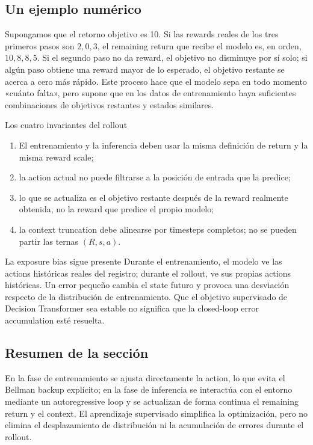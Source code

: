 \subsection{Un ejemplo numérico}

Supongamos que el retorno objetivo es 10. Si las rewards reales de los tres primeros pasos son $2,0,3$, el remaining return que recibe el modelo es, en orden, $10,8,8,5$. Si el segundo paso no da reward, el objetivo no disminuye por sí solo; si algún paso obtiene una reward mayor de lo esperado, el objetivo restante se acerca a cero más rápido. Este proceso hace que el modelo sepa en todo momento «cuánto falta», pero supone que en los datos de entrenamiento haya suficientes combinaciones de objetivos restantes y estados similares.

\begin{importantbox}{Los cuatro invariantes del rollout}
\begin{enumerate}
  \item El entrenamiento y la inferencia deben usar la misma definición de return y la misma reward scale;
  \item la action actual no puede filtrarse a la posición de entrada que la predice;
  \item lo que se actualiza es el objetivo restante después de la reward realmente obtenida, no la reward que predice el propio modelo;
  \item la context truncation debe alinearse por timesteps completos; no se pueden partir las ternas $(R,s,a)$.
\end{enumerate}
\end{importantbox}

\begin{warningbox}{La exposure bias sigue presente}
Durante el entrenamiento, el modelo ve las actions históricas reales del registro; durante el rollout, ve sus propias actions históricas. Un error pequeño cambia el state futuro y provoca una desviación respecto de la distribución de entrenamiento. Que el objetivo supervisado de Decision Transformer sea estable no significa que la closed-loop error accumulation esté resuelta.
\end{warningbox}

\subsection{Resumen de la sección}

En la fase de entrenamiento se ajusta directamente la action, lo que evita el Bellman backup explícito; en la fase de inferencia se interactúa con el entorno mediante un autoregressive loop y se actualizan de forma continua el remaining return y el context. El aprendizaje supervisado simplifica la optimización, pero no elimina el desplazamiento de distribución ni la acumulación de errores durante el rollout.
